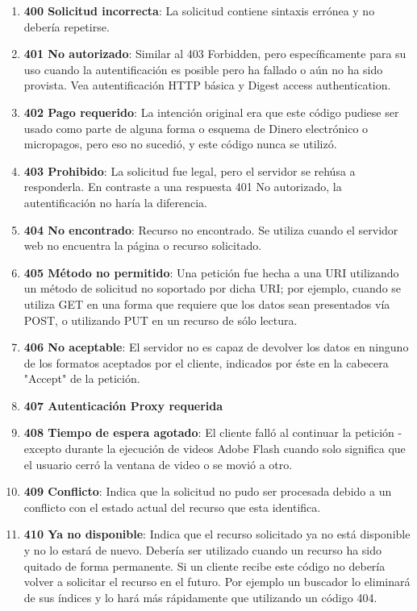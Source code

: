 \begin{enumerate}
\item \textbf{400 Solicitud incorrecta}: La solicitud contiene sintaxis errónea y no debería repetirse.
\item \textbf{401 No autorizado}: Similar al 403 Forbidden, pero específicamente para su uso cuando la autentificación es posible pero ha fallado o aún no ha sido provista. Vea autentificación HTTP básica y Digest access authentication.
\item \textbf{402 Pago requerido}: La intención original era que este código pudiese ser usado como parte de alguna forma o esquema de Dinero electrónico o micropagos, pero eso no sucedió, y este código nunca se utilizó.
\item \textbf{403 Prohibido}: La solicitud fue legal, pero el servidor se rehúsa a responderla. En contraste a una respuesta 401 No autorizado, la autentificación no haría la diferencia.
\item \textbf{404 No encontrado}: Recurso no encontrado. Se utiliza cuando el servidor web no encuentra la página o recurso solicitado.
\item \textbf{405 Método no permitido}: Una petición fue hecha a una URI utilizando un método de solicitud no soportado por dicha URI; por ejemplo, cuando se utiliza GET en una forma que requiere que los datos sean presentados vía POST, o utilizando PUT en un recurso de sólo lectura.
\item \textbf{406 No aceptable}: El servidor no es capaz de devolver los datos en ninguno de los formatos aceptados por el cliente, indicados por éste en la cabecera "Accept" de la petición.
\item \textbf{407 Autenticación Proxy requerida}
\item \textbf{408 Tiempo de espera agotado}: El cliente falló al continuar la petición - excepto durante la ejecución de videos Adobe Flash cuando solo significa que el usuario cerró la ventana de video o se movió a otro.
\item \textbf{409 Conflicto}: Indica que la solicitud no pudo ser procesada debido a un conflicto con el estado actual del recurso que esta identifica.
\item \textbf{410 Ya no disponible}: Indica que el recurso solicitado ya no está disponible y no lo estará de nuevo. Debería ser utilizado cuando un recurso ha sido quitado de forma permanente. Si un cliente recibe este código no debería volver a solicitar el recurso en el futuro. Por ejemplo un buscador lo eliminará de sus índices y lo hará más rápidamente que utilizando un código 404.

\end{enumerate}
